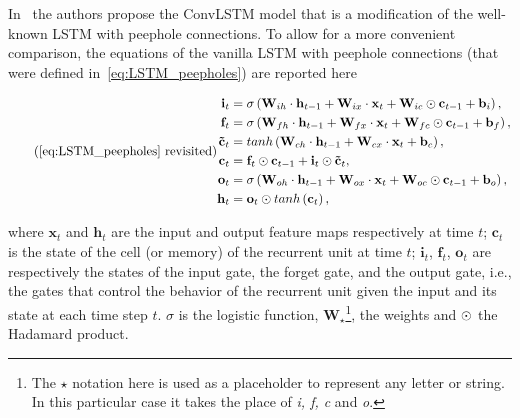 In~\citep{ShiCWYWW15} the authors propose the ConvLSTM model that is a
modification of the well-known LSTM with peephole connections. To allow for a
more convenient comparison, the equations of the vanilla LSTM with peephole
connections (that were defined in~\autoref{eq:LSTM_peepholes}) are reported
here

\begin{equation*}\tag{\ref{eq:LSTM_peepholes} revisited}
\begin{split}
    \mathbf{i}_t &= \sigma\left(
        \mathbf{W}_{ih} \cdot \mathbf{h}_{t-1} +
        \mathbf{W}_{ix} \cdot \mathbf{x}_t +
        \mathbf{W}_{ic} \hadamard \mathbf{c}_{t-1} +
        \mathbf{b}_i \right),\\
    \mathbf{f}_t &= \sigma\left(
        \mathbf{W}_{fh} \cdot \mathbf{h}_{t-1} +
        \mathbf{W}_{fx} \cdot \mathbf{x}_t +
        \mathbf{W}_{fc} \hadamard \mathbf{c}_{t-1} +
        \mathbf{b}_f \right),\\
    \mathbf{\tilde c}_t &= tanh \left(
        \mathbf{W}_{ch} \cdot \mathbf{h}_{t-1} +
        \mathbf{W}_{cx} \cdot \mathbf{x}_t +
        \mathbf{b}_c \right),\\
    \mathbf{c}_t &= \mathbf{f}_t \hadamard \mathbf{c}_{t-1} + \mathbf{i}_t
        \hadamard \mathbf{\tilde c}_t,\\
    \mathbf{o}_t &= \sigma\left(
        \mathbf{W}_{oh} \cdot \mathbf{h}_{t-1} +
        \mathbf{W}_{ox} \cdot \mathbf{x}_t +
        \mathbf{W}_{oc} \hadamard \mathbf{c}_{t-1} +
        \mathbf{b}_o \right),\\
    \mathbf{h}_t &= \mathbf{o}_t \hadamard tanh \left(\mathbf{c}_t\right),
\end{split}
\end{equation*}

\noindent where $\mathbf{x}_t$ and $\mathbf{h}_t$ are the input and output
feature maps respectively at time $t$; $\mathbf{c}_t$ is the state of the cell
(or memory) of the recurrent unit at time $t$; $\mathbf{i}_t$, $\mathbf{f}_t$,
$\mathbf{o}_t$ are respectively the states of the input gate, the forget gate,
and the output gate, i.e., the gates that control the behavior of the recurrent
unit given the input and its state at each time step $t$. $\sigma$ is the
logistic function, $\mathbf{W}_{\star}$\footnote{
    The $\star$ notation here is used as a placeholder to represent any letter
    or string. In this particular case it takes the place of \textit{i, f, c}
    and \textit{o}.},
the weights and $\odot$ the Hadamard product.

